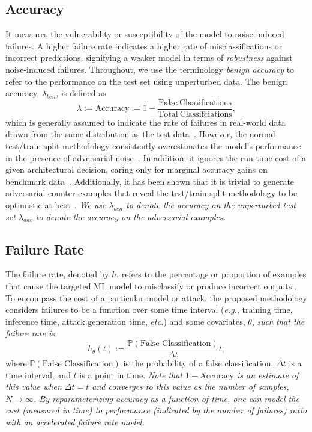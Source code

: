 \documentclass[conference]{IEEEtran}
\newcommand{\cm}[1]{\textit{{\color{blue}#1}}}
\begin{document}
\subsection{Accuracy}
\label{acc}
 It measures the vulnerability or susceptibility of the model to noise-induced failures. A higher failure rate indicates a higher rate of misclassifications or incorrect predictions, signifying a weaker model in terms of \textit{robustness} against noise-induced failures. Throughout, we use the terminology \textit{benign accuracy} to refer to the performance on the test set using unperturbed data. The benign accuracy, $\lambda_{ben}$, is defined as
\begin{equation}
    \lambda:= \mathrm{Accuracy} := 1 - \frac{\mathrm{False~Classifications}}{\mathrm{Total~Classifciations}},
    \label{eq:acc}
\end{equation}
which is generally assumed to indicate the rate of failures in real-world data drawn from the same distribution as the test data~\cite{tan2021critical}. However, the normal test/train split methodology consistently overestimates the model's performance in the presence of adversarial noise~\cite{croce_reliable_2020}. In addition, it ignores the run-time cost of a given architectural decision, caring only for marginal accuracy gains on benchmark data~\cite{desislavov2021compute,bailly2022effects}. Additionally, it has been shown that it is trivial to generate adversarial counter examples that reveal the test/train split methodology to be optimistic at best~\cite{carlini_towards_2017,adversarialpatch,pixelattack,hopskipjump,biggio_poisoning_2013,chakraborty_adversarial_2018,dohmatob_generalized_2019,meyers}. \cm{We use $\lambda_{ben}$ to denote the accuracy on the unperturbed test set $\lambda_{adv}$ to denote the accuracy on the adversarial examples.}

\subsection{Failure Rate}
\label{failure_rate}
The failure rate, denoted by $h$, refers to the percentage or proportion of examples that cause the targeted ML model to misclassify or produce incorrect outputs \cite{meyers}. To encompass the cost of a particular model or attack, the proposed methodology considers failures to be a function over some time interval (\textit{e.g.}, training time, inference time, attack generation time, \textit{etc.}) and some covariates, $\theta$, \cm{such that the failure rate is}
\[
    h_{ \theta}(t) :=  \frac{\mathbb{P}(\textrm{False~Classification})}{\Delta t} t,
\]
where $\mathbb{P}(\textrm{False~Classification})$ is the probability of a false classification, $\Delta t$ is a time interval, and $t$ is a point in time. \cm{Note that  $1 - \text{Accuracy}$  is an estimate of this value when $\Delta t = t$ and converges to this value as the number of samples, $N \rightarrow \infty$. By reparameterizing accuracy as a function of time, one can model the cost (measured in time) to performance (indicated by the number of failures) ratio with an accelerated failure rate model.}
\end{document}
